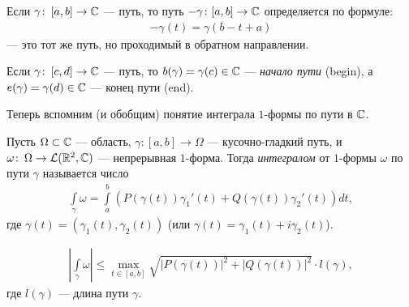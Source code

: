 \begin{notatn*}
 Если $\gamma \colon\, [a,b] \to \mathbb{C}$ --- путь, то путь $-\gamma \colon [a,b] \to \mathbb{C}$ определяется по формуле:
 \begin{align*}
  -\gamma(t) = \gamma(b - t + a)
 \end{align*} --- это тот же путь, но проходимый в обратном направлении.
\end{notatn*}
\begin{notatn*}
 Если $\gamma \colon\, [c, d] \to \mathbb{C}$ --- путь, то $b(\gamma) = \gamma(c) \in \mathbb{C}$ --- \textit{начало пути} (begin), а $e(\gamma) = \gamma(d) \in \mathbb{C}$ --- конец пути (end).
\end{notatn*}

Теперь вспомним (и обобщим) понятие интеграла $1$-формы по пути в $\mathbb{C}$.

\begin{df}
 Пусть $\Omega \subset \mathbb{C}$ --- область, $\gamma \colon [a,b] \to \Omega$ --- кусочно-гладкий путь, и $\omega \colon\, \Omega \to \mathcal{L}(\mathbb{R}^2, \mathbb{C})$ --- непрерывная $1$-форма. Тогда \textit{интегралом} от $1$-формы $\omega$ по пути  $\gamma$ называется число
 \begin{align*}
  \int\limits_{\gamma} \omega = \int\limits_{a}^{b} \left( P(\gamma(t)) \gamma_1'(t) + Q(\gamma(t)) \gamma_2'(t) \right) dt,
 \end{align*} где $\gamma(t) = (\gamma_1(t),\gamma_2(t))$ (или $\gamma(t) = \gamma_1(t) + i \gamma_2(t)$).
\end{df}
\begin{lm}
 \begin{align*}
  \left| \int\limits_{\gamma} \omega  \right| \leqslant \max_{t \in [a,b]} \sqrt{\left| P(\gamma(t)) \right|^{2} + \left| Q(\gamma(t)) \right|^{2}} \cdot l(\gamma),
 \end{align*} где $l(\gamma)$ --- длина пути $\gamma$.
\end{lm}
